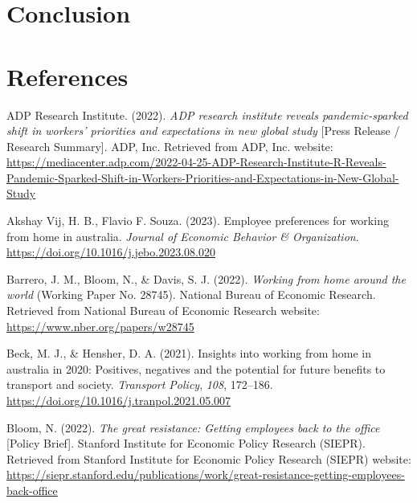\documentclass[
  a4paper,
]{article}
\newlength{\cslhangindent}
\newenvironment{CSLReferences}[2] %
 {\begin{list}{}{%
  \setlength{\itemindent}{0pt}
  \setlength{\leftmargin}{0pt}
  \setlength{\parsep}{0pt}
  \ifodd #1
   \setlength{\leftmargin}{\cslhangindent}
   \setlength{\itemindent}{-1\cslhangindent}
  \fi
  \setlength{\itemsep}{#2\baselineskip}}}
 {\end{list}}
\numberwithin{equation}{section}
\numberwithin{figure}{section}
\numberwithin{table}{section}
\begin{document}
\section{Conclusion}\label{conclusion}

\clearpage
\vspace*{1cm}

\section*{References}\label{references}

\vspace*{0.8cm}

\protect{}\label{refs}
\begin{CSLReferences}{1}{0}
ADP Research Institute. (2022). \emph{ADP research institute reveals pandemic-sparked shift in workers' priorities and expectations in new global study} {[}Press Release / Research Summary{]}. ADP, Inc. Retrieved from ADP, Inc. website: \url{https://mediacenter.adp.com/2022-04-25-ADP-Research-Institute-R-Reveals-Pandemic-Sparked-Shift-in-Workers-Priorities-and-Expectations-in-New-Global-Study}

Akshay Vij, H. B., Flavio F. Souza. (2023). Employee preferences for working from home in australia. \emph{Journal of Economic Behavior \& Organization}. \url{https://doi.org/10.1016/j.jebo.2023.08.020}

Barrero, J. M., Bloom, N., \& Davis, S. J. (2022). \emph{Working from home around the world} (Working Paper No. 28745). National Bureau of Economic Research. Retrieved from National Bureau of Economic Research website: \url{https://www.nber.org/papers/w28745}

Beck, M. J., \& Hensher, D. A. (2021). Insights into working from home in australia in 2020: Positives, negatives and the potential for future benefits to transport and society. \emph{Transport Policy}, \emph{108}, 172--186. \url{https://doi.org/10.1016/j.tranpol.2021.05.007}

Bloom, N. (2022). \emph{The great resistance: Getting employees back to the office} {[}Policy Brief{]}. Stanford Institute for Economic Policy Research (SIEPR). Retrieved from Stanford Institute for Economic Policy Research (SIEPR) website: \url{https://siepr.stanford.edu/publications/work/great-resistance-getting-employees-back-office}


\end{CSLReferences}
\end{document}
